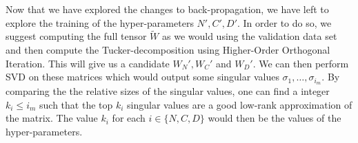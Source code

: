 \documentclass[a4paper]{article}
\begin{document}
Now that we have explored the changes to back-propagation, we have left to explore the training of the hyper-parameters $N',C',D'$. In order to do so, we suggest computing the full tensor $\tilde{W}$ as we would using the validation data set and then compute the Tucker-decomposition using Higher-Order Orthogonal Iteration. This will give us a candidate $W_N', W_C'$ and $W_D'$. We can then perform \textsf{SVD} on these matrices which would output some singular values $\sigma_1, \dots, \sigma_{i_m}$. By comparing the the relative sizes of the singular values, one can find a integer $k_i \leq i_m$ such that the top $k_i$ singular values are a good low-rank approximation of the matrix. The value $k_i$ for each $i \in \{N, C, D\}$  would then be the values of the hyper-parameters.  
\end{document}
